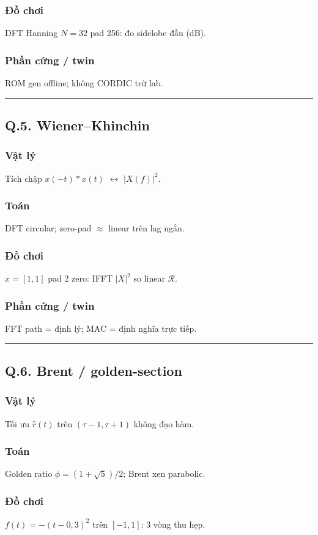 \subsubsection*{Đồ chơi}
DFT Hanning $N=32$ pad 256: đo sidelobe đầu (dB).
\subsubsection*{Phần cứng / twin}
ROM gen offline; không CORDIC trừ lab.
\vspace{0.25cm}\hrule\vspace{0.25cm}
\subsection*{Q.5. Wiener--Khinchin}
\subsubsection*{Vật lý}
Tích chập $x(-t)*x(t)$ $\leftrightarrow$ $|X(f)|^2$.
\subsubsection*{Toán}
DFT circular; zero-pad $\approx$ linear trên lag ngắn.
\subsubsection*{Đồ chơi}
$x=[1,1]$ pad 2 zero: IFFT $|X|^2$ so linear $\mathcal{R}$.
\subsubsection*{Phần cứng / twin}
FFT path = định lý; MAC = định nghĩa trực tiếp.
\vspace{0.25cm}\hrule\vspace{0.25cm}
\subsection*{Q.6. Brent / golden-section}
\subsubsection*{Vật lý}
Tối ưu $\hat r(t)$ trên $(\tau-1,\tau+1)$ không đạo hàm.
\subsubsection*{Toán}
Golden ratio $\phi=(1+\sqrt5)/2$; Brent xen parabolic.
\subsubsection*{Đồ chơi}
$f(t)=-(t-0{,}3)^2$ trên $[-1,1]$: 3 vòng thu hẹp.
